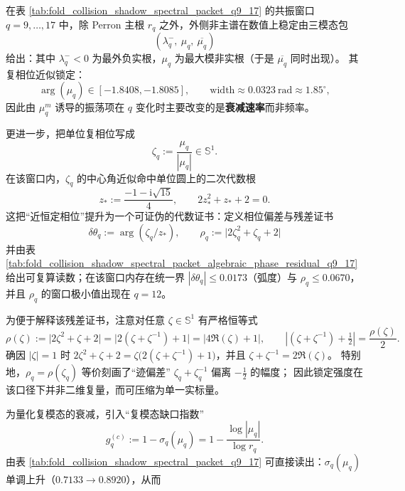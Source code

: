 



\begin{remark}\label{rem:pom-resonance-trimodal-phase-lock}
在表 \ref{tab:fold_collision_shadow_spectral_packet_q9_17} 的共振窗口 \(q=9,\dots,17\) 中，除 Perron 主根 \(r_q\) 之外，外侧非主谱在数值上稳定由三模态包
\[
(\lambda_q^-,\ \mu_q,\ \overline{\mu_q})
\]
给出：其中 \(\lambda_q^-<0\) 为最外负实根，\(\mu_q\) 为最大模非实根（于是 \(\overline{\mu_q}\) 同时出现）。
其复相位近似锁定：
\[
\arg(\mu_q)\in[-1.8408,-1.8085],
\qquad
\mathrm{width}\approx 0.0323\ \mathrm{rad}\approx 1.85^\circ,
\]
因此由 \(\mu_q^m\) 诱导的振荡项在 \(q\) 变化时主要改变的是\textbf{衰减速率}而非频率。
\par
更进一步，把单位复相位写成
\[
\zeta_q:=\frac{\mu_q}{|\mu_q|}\in\mathbb{S}^1.
\]
在该窗口内，\(\zeta_q\) 的中心角近似命中单位圆上的二次代数根
\[
z_\ast:=\frac{-1-\mathrm{i}\sqrt{15}}{4},
\qquad
2z_\ast^2+z_\ast+2=0.
\]
这把“近恒定相位”提升为一个可证伪的代数证书：定义相位偏差与残差证书
\[
\delta\theta_q:=\arg(\zeta_q/z_\ast),
\qquad
\rho_q:=\bigl|2\zeta_q^2+\zeta_q+2\bigr|
\]
并由表 \ref{tab:fold_collision_shadow_spectral_packet_algebraic_phase_residual_q9_17} 给出可复算读数；在该窗口内存在统一界 \(|\delta\theta_q|\le 0.0173\)（弧度）与 \(\rho_q\le 0.0670\)，并且 \(\rho_q\) 的窗口极小值出现在 \(q=12\)。
\par
为便于解释该残差证书，注意对任意 \(\zeta\in\mathbb{S}^1\) 有严格恒等式
\begin{equation}\label{eq:pom-phase-lock-residual-trace-equivalence}
\rho(\zeta):=\bigl|2\zeta^{2}+\zeta+2\bigr|
=\bigl|2(\zeta+\zeta^{-1})+1\bigr|
=\bigl|4\Re(\zeta)+1\bigr|,
\qquad
\left|(\zeta+\zeta^{-1})+\tfrac12\right|=\frac{\rho(\zeta)}{2}.
\end{equation}
确因 \(|\zeta|=1\) 时 \(2\zeta^2+\zeta+2=\zeta\bigl(2(\zeta+\zeta^{-1})+1\bigr)\)，并且 \(\zeta+\zeta^{-1}=2\Re(\zeta)\)。
特别地，\(\rho_q=\rho(\zeta_q)\) 等价刻画了“迹偏差” \(\zeta_q+\zeta_q^{-1}\) 偏离 \(-\tfrac12\) 的幅度；
因此锁定强度在该口径下并非二维复量，而可压缩为单一实标量。
\par
为量化复模态的衰减，引入“复模态缺口指数”
\[
g_q^{(c)}:=1-\sigma_q(\mu_q)
=1-\frac{\log|\mu_q|}{\log r_q}.
\]
由表 \ref{tab:fold_collision_shadow_spectral_packet_q9_17} 可直接读出：\(\sigma_q(\mu_q)\) 单调上升（\(0.7133\to 0.8920\)），从而

\end{remark}
